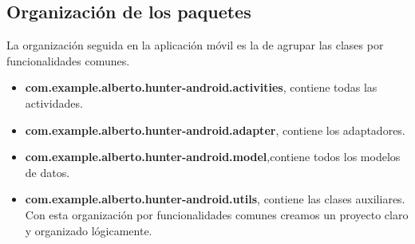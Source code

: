 \subsection{Organización de los paquetes}
La organización seguida en la aplicación móvil es la de agrupar las clases por funcionalidades comunes.
\begin{itemize}
\item  \textbf{com.example.alberto.hunter-android.activities}, contiene todas las actividades.
\item \textbf{com.example.alberto.hunter-android.adapter}, contiene los adaptadores.
\item \textbf{com.example.alberto.hunter-android.model},contiene todos los modelos de datos.
\item \textbf{com.example.alberto.hunter-android.utils}, contiene las clases auxiliares.
Con esta organización por funcionalidades comunes creamos un proyecto claro y  organizado lógicamente.

\end{itemize}



